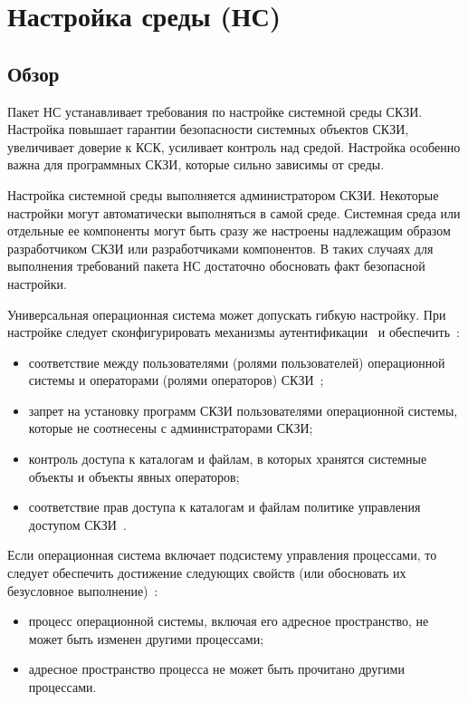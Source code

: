 \section{Настройка среды (НС)}\label{ES}

\subsection{Обзор}\label{ES.Defs}

Пакет НС устанавливает требования по настройке системной среды СКЗИ.
%
Настройка повышает гарантии безопасности системных объектов СКЗИ,
увеличивает доверие к КСК, усиливает контроль над средой.
%
Настройка особенно важна для программных СКЗИ, которые сильно зависимы от 
среды.

Настройка системной среды выполняется администратором СКЗИ.
Некоторые настройки могут автоматически выполняться в самой среде. 
%
Системная среда или отдельные ее компоненты могут быть сразу же 
настроены надлежащим образом разработчиком СКЗИ или разработчиками компонентов.  
%
В таких случаях для выполнения требований пакета НС достаточно обосновать факт 
безопасной настройки.

Универсальная операционная система может допускать гибкую настройку.
При настройке следует сконфигурировать механизмы 
аутентификации~ и
обеспечить~:
\begin{itemize}
\item
соответствие между пользователями (ролями пользователей) 
операционной системы и операторами (ролями операторов) 
СКЗИ~;
\item
запрет на установку программ СКЗИ пользователями операционной системы, которые
не соотнесены с администраторами СКЗИ;
\item
контроль доступа к каталогам и файлам, в которых хранятся системные объекты и
объекты явных операторов;
\item
соответствие прав доступа к каталогам и файлам политике управления доступом
СКЗИ~.
\end{itemize}

Если операционная система включает подсистему управления процессами,
то следует обеспечить достижение следующих свойств 
(или обосновать их безусловное выполнение)~:
\begin{itemize}
\item
процесс операционной системы, включая его адресное пространство, не может быть 
изменен другими процессами;
\item
адресное пространство процесса не может быть прочитано другими процессами.
\end{itemize}

